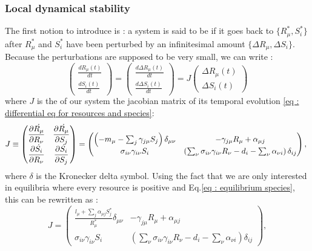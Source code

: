 \documentclass[12pt, titlepage]{report}
\begin{document}
\subsubsection{Local dynamical stability}
The first notion to introduce is  : a system is said to be  if it goes back to  $\{ R^*_\mu, S^*_i \} $ after $R^*_\mu$ and $S^*_i$ have been perturbed by an infinitesimal amount $\{ \Delta R_\mu, \Delta S_i \}$.
Because the perturbations are supposed to be very small, we can write :
\begin{equation}
\begin{pmatrix}
\frac{dR_\mu(t)}{dt} \\
\frac{dS_i(t)}{dt}
\end{pmatrix}
=
\begin{pmatrix}
\frac{d\Delta R_\mu(t)}{dt} \\
\frac{d\Delta S_i(t)}{dt}
\end{pmatrix}
=
J
\begin{pmatrix}
\Delta R_\mu(t) \\
\Delta S_i(t)
\end{pmatrix}
\end{equation}
where $J$ is the  of our system \ie the jacobian matrix of its temporal evolution \eqref{eq : differential eq for resources and species}:
\begin{equation}
  J \defined
\begin{pmatrix}
  \partiald{\dot{R_\mu}}{R_\nu}& \partiald{\dot{R_\mu}}{S_j} \\
  \partiald{\dot{S_i}}{R_\nu} & \partiald{\dot{S_i}}{S_j}
\end{pmatrix}
=
\begin{pmatrix}
  \left(-m_\mu-\sum_j \gamma_{j\mu}S_j\right)\delta_{\mu\nu} & -\gamma_{j\mu}R_\mu+\alpha_{\mu j} \\
  \sigma_{i\nu}\gamma_{i\nu}S_i &\left(\sum_{\nu} \sigma_{i\nu}\gamma_{i\nu}R_\nu-d_i-\sum_\nu \alpha_{\nu i}\right)\delta_{ij}
\end{pmatrix}, \label{eq : definition of jacobian}
\end{equation}
where $\delta$ is the Kronecker delta symbol. Using the fact that we are only interested in equilibria where every resource is positive and Eq.\eqref{eq : equilibrium species}, this can be rewritten as :
\begin{equation}
 J = \begin{pmatrix}
   \frac{l_\mu + \sum_j \alpha_{\mu j}S_j^*}{R^*_\mu}\delta_{\mu\nu} & -\gamma_{j\mu}R_\mu+\alpha_{\mu j} \\
   \sigma_{i\nu}\gamma_{i\nu}S_i &\left(\sum_{\nu} \sigma_{i\nu}\gamma_{i\nu}R_\nu-d_i-\sum_\nu \alpha_{\nu i}\right)\delta_{ij}
 \end{pmatrix}, \label{eq : definition of jacobian alternative}
\end{equation}
\end{document}
